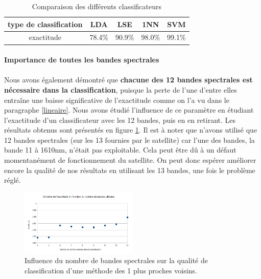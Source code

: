 \documentclass[a4paper,10pt]{article}
\begin{document}
\begin{table}[H]
\begin{center}
 \begin{tabular}{|c|c|c|c|c|}
  \hline
  type de classification & LDA & LSE & 1NN & SVM \\
  \hline
exactitude & 78.4\% & 90.9\% & 	98.0\% & 99.1\% \\
  \hline
  \end{tabular}
\end{center}
\caption{Comparaison des différents classificateurs}
\label{table:comp}
\end{table}

\paragraph{Importance de toutes les bandes spectrales}
\paragraph{} 
Nous avons également démontré que \textbf{chacune des 12 bandes spectrales est nécessaire dans la classification}, puisque la perte de l'une d'entre elles entraîne une baisse significative de l'exactitude comme on l'a vu dans le paragraphe \ref{lineaire}. Nous avons étudié l'influence de ce paramètre en étudiant l'exactitude d'un classificateur avec les 12 bandes, puis en en retirant. Les résultats obtenus sont présentés en figure \ref{fig:nBandes}. 
\newline
Il est à noter que n'avons utilisé que 12 bandes spectrales (sur les 13 fournies par le satellite) car l'une des bandes, la bande 11 à 1610nm, n'était  pas exploitable. Cela peut être dû à un défaut momentanément de fonctionnement du satellite. On peut donc espérer améliorer encore la qualité de nos résultats en utilisant les 13 bandes, une fois le problème réglé.

\begin{figure}[H]
  \centering
    \includegraphics[width=0.5\textwidth]{nb_bands}
  \caption{Influence du nombre de bandes spectrales sur la qualité de classification d'une méthode des 1 plus proches voisins.}
  \label{fig:nBandes}
\end{figure}
\end{document}
